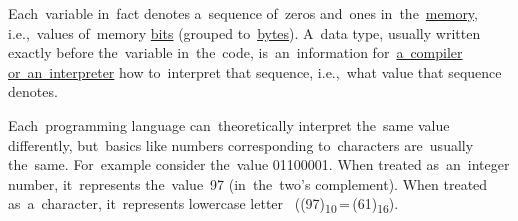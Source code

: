 \label{datatypes}
Each~variable in~fact denotes a~sequence of~zeros and~ones in~the~\hyperref[systemmemory]{memory}, i.e.,~values of~memory \hyperref[bitsbytes]{bits} (grouped to~\hyperref[bitsbytes]{bytes}).
A~data type, usually written exactly before the~variable in~the~code, is~an~information for~\hyperref[compiledinterpretedlanguages]{a~compiler or~an~interpreter} how to~interpret that sequence, i.e.,~what value that sequence denotes.

Each~programming language can~theoretically interpret the~same value differently, but~basics like numbers corresponding to~characters are~usually the~same.
For~example consider the~value 01100001.
When treated as~an~integer number, it~represents the~value~97 (in~the~two's complement).
When treated as~a~character, it~represents lowercase letter~ \mbox{((97)\textsubscript{10}\,=\,(61)\textsubscript{16})}.
